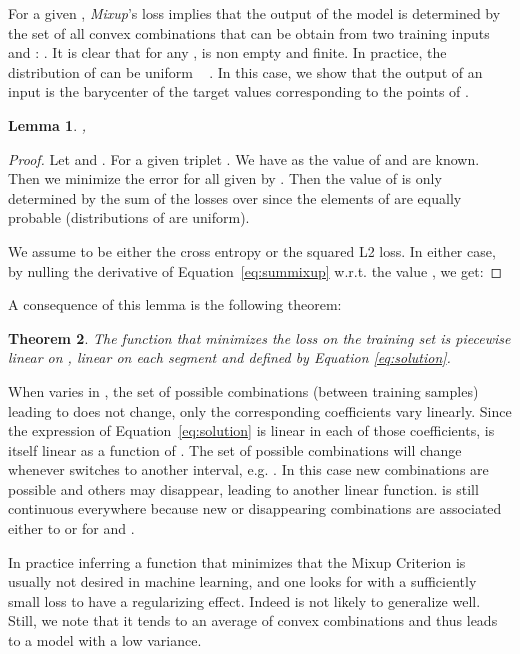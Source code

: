 \documentclass[twoside]{article}
\newtheorem{theorem}{Theorem}[section]
\newtheorem{lemma}[theorem]{Lemma}
\numberwithin{intassumption}{assumption}
\begin{document}
For a given , \emph{Mixup}'s loss implies that the output  of the model is determined by the set  of all convex combinations that can be obtain  from two training inputs  and : . 
 It is clear that for any ,  is non empty and finite. In practice, the distribution of  can be uniform  ~\citep{zhang2017mixup,manifold}  . In this case, we show that the output  of an input  is the barycenter of the target values corresponding to the points of .
\begin{lemma}
   ,
    
\end{lemma}
\begin{proof}
Let  and . For a given triplet . We have  as the value of  and  are known. Then we minimize the error for all  given by . Then the value of  is only determined by the sum of the losses over 
since the elements of  are equally probable (distributions of  are uniform). 

We assume  to be either the cross entropy or the squared L2 loss. In either case, by nulling the derivative of Equation~\eqref{eq:summixup} w.r.t. the value , we get: 

\end{proof}
A consequence of this lemma is the following theorem:
\begin{theorem}
     The function  that minimizes the loss on the training set is piecewise linear on , linear on each segment  and defined by Equation \eqref{eq:solution}.
\end{theorem}

When  varies in , the set of possible combinations (between training samples) leading to  does not change, only the corresponding coefficients  vary linearly. Since the expression of Equation~\eqref{eq:solution} is linear in each of those coefficients,  is itself linear as a function of . The set of possible combinations will change whenever  switches to another interval, e.g. . In this case new combinations are possible and others may disappear, leading to another linear function.  is still continuous everywhere because new or disappearing combinations are associated either to  or  for  and .

In practice inferring a function  that minimizes that the Mixup Criterion is usually not desired in machine learning, and one looks for  with a sufficiently small loss to have a regularizing effect. Indeed  is not likely to generalize well. Still, we note that it tends to an average of convex combinations and thus leads to a model with a low variance. 
\end{document}
